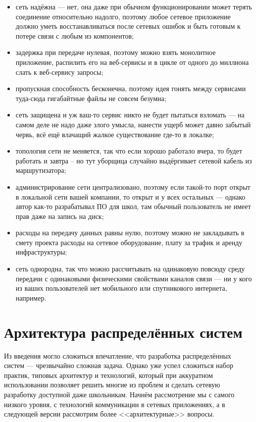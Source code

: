 \documentclass[a5paper]{article}
\begin{document}
\begin{itemize}
    \item сеть надёжна --- нет, она даже при обычном функционировании может терять соединение относительно надолго, поэтому любое сетевое приложение должно уметь восстанавливаться после сетевых ошибок и быть готовым к потере связи с любым из компонентов;
    \item задержка при передаче нулевая, поэтому можно взять монолитное приложение, распилить его на веб-сервисы и в цикле от одного до миллиона слать к веб-сервису запросы;
    \item пропускная способность бесконечна, поэтому идея гонять между сервисами туда-сюда гигабайтные файлы не совсем безумна;
    \item сеть защищена и уж ваш-то сервис никто не будет пытаться взломать --- на самом деле не надо даже злого умысла, нанести ущерб может давно забытый червь, всё ещё влачащий жалкое существование где-то в локалке;
    \item топология сети не меняется, так что если хорошо работало вчера, то будет работать и завтра -- но тут уборщица случайно выдёргивает сетевой кабель из маршрутизатора;
    \item администрирование сети централизовано, поэтому если такой-то порт открыт в локальной сети вашей компании, то открыт и у всех остальных --- однако автор как-то разрабатывал ПО для школ, там обычный пользователь не имеет прав даже на запись на диск;
    \item расходы на передачу данных равны нулю, поэтому можно не закладывать в смету проекта расходы на сетевое оборудование, плату за трафик и аренду инфраструктуры;
    \item сеть однородна, так что можно рассчитывать на одинаковую повсюду среду передачи с одинаковыми физическими свойствами каналов связи --- ни у кого из ваших пользователей нет мобильного или спутникового интернета, например.
\end{itemize}

\section{Архитектура распределённых систем}

Из введения могло сложиться впечатление, что разработка распределённых систем --- чрезвычайно сложная задача. Однако уже успел сложиться набор практик, типовых архитектур и технологий, который при аккуратном использовании позволяет решить многие из проблем и сделать сетевую разработку доступной даже школьникам. Начнём рассмотрение мы с самого низкого уровня, с технологий коммуникации в сетевых приложениях, а в следующей версии рассмотрим более <<архитектурные>> вопросы.
\end{document}
